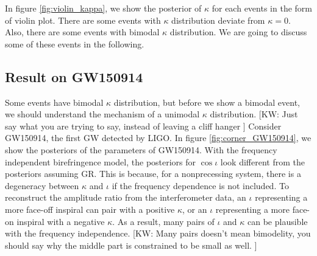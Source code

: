 \documentclass[aps,prd,twocolumn,superscriptaddress,preprintnumbers,floatfix,nofootinbib]{revtex4-2}
\newcommand{\kw}[1]{{\color{rb4}[KW: #1 ]}}
\begin{document}
In figure \ref{fig:violin_kappa}, we show the posterior of $\kappa$ for each events in the form of violin plot.
There are some events with $\kappa$ distribution deviate from $\kappa=0$.
Also, there are some events with bimodal $\kappa$ distribution.
We are going to discuss some of these events in the following.





\subsection{Result on GW150914}
Some events have bimodal $\kappa$ distribution, but before we show a bimodal
event, we should understand the mechanism of a unimodal $\kappa$ distribution.
\kw{Just say what you are trying to say, instead of leaving a cliff hanger}
Consider GW150914, the first GW detected by LIGO. In figure
\ref{fig:corner_GW150914}, we show the posteriors of the parameters of GW150914.
With the frequency independent birefringence model, the posteriors for
$\cos\iota$ look different from the posteriors assuming GR. This is because, for
a nonprecessing system, there is a degeneracy between $\kappa$ and $\iota$ if
the frequency dependence is not included. To reconstruct the amplitude ratio
from the interferometer data, an $\iota$ representing a more face-off inspiral
can pair with a positive $\kappa$, or an $\iota$ representing a more face-on
inspiral with a negative $\kappa$. As a result, many pairs of $\iota$ and
$\kappa$ can be plausible with the frequency independence. \kw{Many pairs
doesn't mean bimodelity, you should say why the middle part is constrained to be small as well.}
\end{document}

